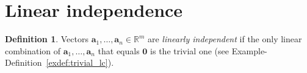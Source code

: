 \documentclass[12pt]{amsart}
\newcommand{\RR}{\mathbb{R}} \DeclareMathOperator{\rref}{rref}
\theoremstyle{definition} \newtheorem{definition}[theorem]{Definition}
\newcommand{\ba}{\mathbf{a}} \newcommand{\bb}{\mathbf{b}}
\newcommand{\bzero}{\mathbf{0}}
\newcommand{\bas}{\ba_1,\ldots,\ba_n}
\begin{document}

\section{Linear independence}

\begin{definition} Vectors $\bas\in\RR^m$ are \emph{linearly independent} if
the only linear combination of $\bas$ that equals $\bzero$ is the trivial one
(see Example-Definition~\ref{exdef:trivial_lc}).  \end{definition}
\end{document}
